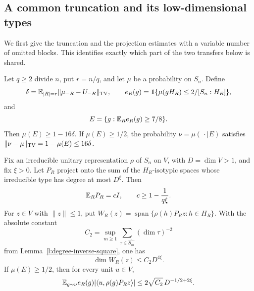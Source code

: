 \subsection{A common truncation and its low-dimensional types}

We first give the truncation and the projection estimates with a variable
number of omitted blocks. This identifies exactly which part of the two
transfers below is shared.

\begin{lemma}
\label{l:adaptive-domain-preparation}
Let $q\ge2$ divide $n$, put $r=n/q$, and let $\mu$ be a probability
on $S_n$. Define
\[
 \delta=\mathbb E_{|R|=r}\|\mu_{-R}-U_{-R}\|_{\mathrm{TV}},\qquad
 e_R(g)=\mathbf1\{\mu(gH_R)\le2/[S_n:H_R]\},
\]
and
\[
 E=\{g:\mathbb E_R e_R(g)\ge7/8\}.
\]
Then $\mu(E)\ge1-16\delta$. If $\mu(E)\ge1/2$, the probability
$\nu=\mu(\,\cdot\mid E)$ satisfies
$\|\nu-\mu\|_{\mathrm{TV}}=1-\mu(E)\le16\delta$.

Fix an irreducible unitary representation $\rho$ of $S_n$ on $V$,
with $D=\dim V>1$, and fix $\xi>0$. Let $P_R$ project onto the sum
of the $H_R$-isotypic spaces whose irreducible type has degree at most
$D^\xi$. Then
\begin{equation}
 \mathbb E_R P_R=cI,\qquad c\ge1-\frac1{q\xi}.
 \label{l:adaptive-scalar-projection}
\end{equation}
For $z\in V$ with $\|z\|\le1$, put
$W_R(z)=\operatorname{span}\{\rho(h)P_Rz:h\in H_R\}$.
With the absolute constant
\[
 C_2=\sup_{m\ge1}\sum_{\tau\in\widehat{S_m}}(\dim\tau)^{-2}
\]
from Lemma~\ref{l:degree-inverse-square}, one has
\begin{equation}
 \dim W_R(z)\le C_2D^{4\xi}.
 \label{l:adaptive-small-orbit}
\end{equation}
If $\mu(E)\ge1/2$, then for every unit $u\in V$,
\begin{equation}
 \mathbb E_{g\sim\nu} e_R(g)
       |\langle u,\rho(g)P_Rz\rangle|
 \le 2\sqrt{C_2}\,D^{-1/2+2\xi}.
 \label{l:adaptive-good-coefficient}
\end{equation}
\end{lemma}

